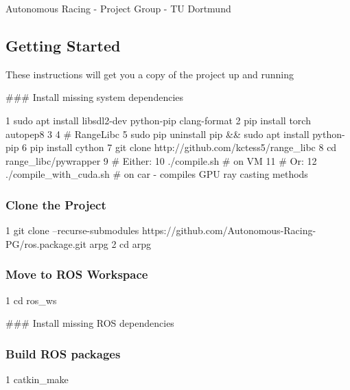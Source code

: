 Autonomous Racing -\/ Project Group -\/ TU Dortmund

\href{https://travis-ci.com/Autonomous-Racing-PG/ros.package}{\tt }

\subsection*{Getting Started}

These instructions will get you a copy of the project up and running

\#\#\# Install missing system dependencies 
\begin{DoxyCode}
1 sudo apt install libsdl2-dev python-pip clang-format
2 pip install torch autopep8
3 
4 # RangeLibc
5 sudo pip uninstall pip && sudo apt install python-pip
6 pip install cython
7 git clone http://github.com/kctess5/range\_libc
8 cd range\_libc/pywrapper
9 # Either:
10 ./compile.sh            # on VM
11 # Or:
12 ./compile\_with\_cuda.sh  # on car - compiles GPU ray casting methods
\end{DoxyCode}


\subsubsection*{Clone the Project}


\begin{DoxyCode}
1 git clone --recurse-submodules https://github.com/Autonomous-Racing-PG/ros.package.git arpg
2 cd arpg
\end{DoxyCode}


\subsubsection*{Move to R\+OS Workspace}


\begin{DoxyCode}
1 cd ros\_ws
\end{DoxyCode}


\#\#\# Install missing R\+OS dependencies 


\subsubsection*{Build R\+OS packages}


\begin{DoxyCode}
1 catkin\_make
\end{DoxyCode}



